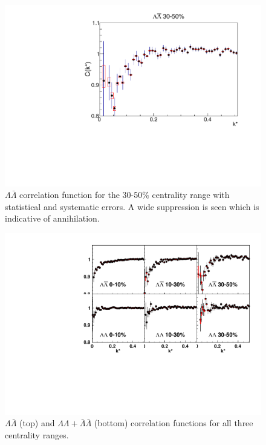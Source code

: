 \begin{figure}[hbtp]
\includegraphics[width=36pc]{Figures/CFs/2016-8-30-CFLamALam3050CombinedSystematicsMaximum.pdf}
\caption[$\Lambda\bar{\Lambda}$ correlation function for the 30-50\% centrality range]{$\Lambda\bar{\Lambda}$ correlation function for the 30-50\% centrality range with statistical and systematic errors.  
A wide suppression is seen which is indicative of annihilation.}
\label{fig:CFLamALam3050}
\end{figure}

\begin{figure}[hbtp]
\includegraphics[width=36pc]{Figures/CFs/2016-08-30-AllCFsWithSysErrorsNoFit.pdf}
\caption[All $\Lambda\Lambda+\bar{\Lambda}\bar{\Lambda}$ and $\Lambda\bar{\Lambda}$ correlation functions]{$\Lambda\bar{\Lambda}$ (top) and $\Lambda\Lambda+\bar{\Lambda}\bar{\Lambda}$ (bottom) correlation functions for all three centrality ranges.}
\label{fig:CFAllOnOnePlot}
\end{figure}



